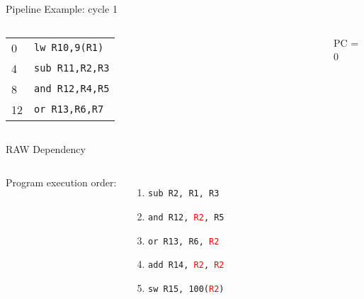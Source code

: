 \documentclass[aspectratio=169,12pt]{beamer}
\begin{document}
\begin{frame}{Pipeline Example: cycle 1}
    \begin{columns}
        \begin{tabular}{ll}
            0 & \texttt{lw R10,9(R1)}\\
            4 & \texttt{sub R11,R2,R3}\\
            8 & \texttt{and R12,R4,R5}\\
            12 & \texttt{or R13,R6,R7}
        \end{tabular}
        
        \centering
        PC = 0
        \vspace{0.5cm}
        
    \end{columns}
\end{frame}

\begin{frame}{RAW Dependency}
    \begin{columns}
        Program execution order:
        \begin{enumerate}
            \item \texttt{sub R2, R1, R3}
            \item \texttt{and R12, \textcolor{red}{R2}, R5}
            \item \texttt{or R13, R6, \textcolor{red}{R2}}
            \item \texttt{add R14, \textcolor{red}{R2}, \textcolor{red}{R2}}
            \item \texttt{sw R15, 100(\textcolor{red}{R2})}
        \end{enumerate}
        
        \centering
    \end{columns}
\end{frame}
\end{document}
